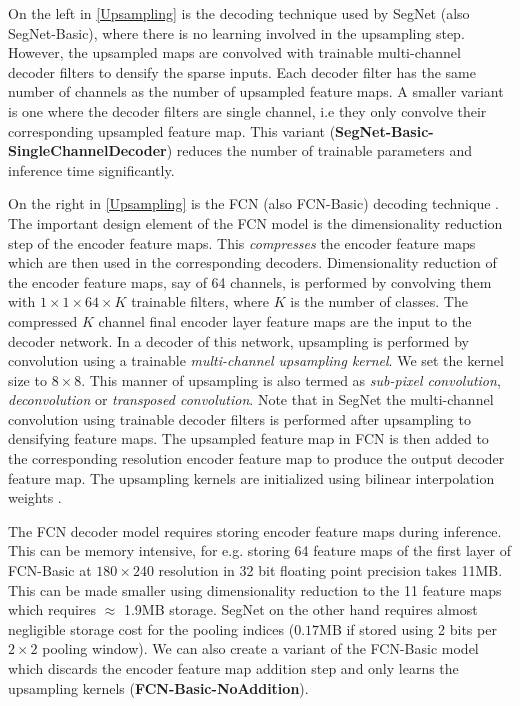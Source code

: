 On the left in \cref{Upsampling} is the decoding technique used by SegNet (also SegNet-Basic), where there is no learning involved in the upsampling step. However, the upsampled maps are convolved with trainable multi-channel decoder filters to densify the sparse inputs. Each decoder filter has the same number of channels as the number of upsampled feature maps. A smaller variant is one where the decoder filters are single channel, i.e they only convolve their corresponding upsampled feature map. This variant (\textbf{SegNet-Basic-SingleChannelDecoder}) reduces the number of trainable parameters and inference time significantly.

On the right in \cref{Upsampling} is the FCN (also FCN-Basic) decoding technique \citep{long2015fully}. The important design element of the FCN model is the dimensionality reduction step of the encoder feature maps. This \textit{compresses} the encoder feature maps which are then used in the corresponding decoders. Dimensionality reduction of the encoder feature maps, say of 64 channels, is performed by convolving them with $1\times 1\times 64\times K$ trainable filters, where $K$ is the number of classes. The compressed $K$ channel final encoder layer feature maps are the input to the decoder network. In a decoder of this network, upsampling is performed by convolution using a trainable \textit{multi-channel upsampling kernel}. We set the kernel size to $8\times8$. This manner of upsampling is also termed as \textit{sub-pixel convolution}, \textit{deconvolution} or \textit{transposed convolution}. Note that in SegNet the multi-channel convolution using trainable decoder filters is performed after upsampling to densifying feature maps. The upsampled feature map in FCN is then added to the corresponding resolution encoder feature map to produce the output decoder feature map. The upsampling kernels are initialized using bilinear interpolation weights \citep{long2015fully}. 

The FCN decoder model requires storing encoder feature maps during inference. This can be memory intensive, for e.g. storing 64 feature maps of the first layer of FCN-Basic at $180\times240$ resolution in 32 bit floating point precision takes 11MB. This can be made smaller using dimensionality reduction to the 11 feature maps which requires $\approx$ 1.9MB storage. SegNet on the other hand requires almost negligible storage cost for the pooling indices ($0.17$MB if stored using 2 bits per $2\times2$ pooling window). We can also create a variant of the FCN-Basic model which discards the encoder feature map addition step and only learns the upsampling kernels (\textbf{FCN-Basic-NoAddition}). 

